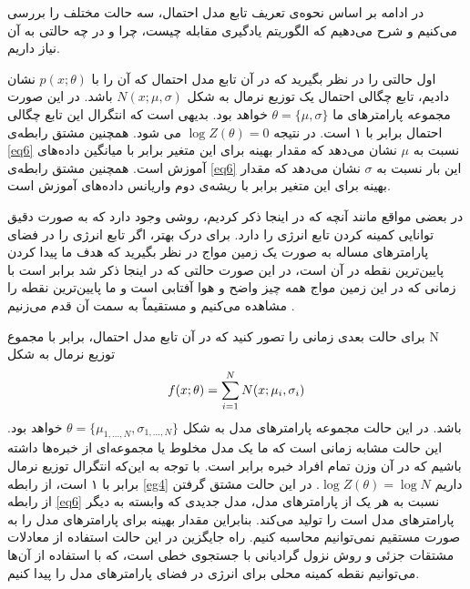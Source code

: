 در ادامه بر اساس نحوه‌ی تعریف تابع مدل احتمال، سه‌ حالت مختلف را بررسی‌ می‌‌کنیم و شرح می‌‌دهیم که الگوریتم یادگیری مقابله چیست، چرا و در چه حالتی به آن نیاز داریم.

اول حالتی را در نظر بگیرید که در آن تابع مدل احتمال
 که آن را با
$p(x;\theta)$
نشان دادیم، تابع چگالی احتمال یک توزیع نرمال
 به شکل
$N(x;\mu,\sigma)$
باشد. در این صورت مجموعه پارامتر‌های ما
$\theta = \{\mu,\sigma\}$
خواهد بود. بدیهی‌ است که انتگرال این تابع چگالی احتمال برابر با ۱ است. در نتیجه
$\log Z(\theta)=0$
می‌ شود. همچنین مشتق رابطه‌ی
\ref{eq6}
نسبت به
$\mu$
نشان می‌‌دهد که مقدار بهینه برای این متغیر
برابر با میانگین داده‌های آموزش است. همچنین مشتق رابطه‌ی
\ref{eq6}
این بار نسبت به
$\sigma$
نشان می‌‌دهد که مقدار بهینه برای این متغیر برابر با ریشه‌ی دوم واریانس داده‌های آموزش است.

در بعضی‌ مواقع مانند آنچه که در اینجا ذکر کردیم، روشی‌ وجود دارد که به صورت دقیق توانایی کمینه کردن تابع انرژی را دارد. برای درک بهتر، اگر تابع انرژی را در فضای پارامتر‌های مساله به صورت یک زمین مواج
در نظر بگیرید که هدف ما پیدا کردن پایین‌ترین نقطه در آن است، در این  صورت حالتی که در اینجا ذکر شد برابر است با زمانی‌ که در این زمین مواج همه چیز واضح و هوا آفتابی است و ما پایین‌ترین نقطه را مشاهده می‌‌کنیم و مستقیماً به سمت آن قدم می‌‌زنیم
\cite{woodfordnotes}.

برای حالت بعدی زمانی‌ را تصور کنید که در آن تابع مدل احتمال، برابر با مجموع
N
توزیع نرمال به شکل
\begin{align}
	\centering
	f(x;\theta)=\sum_{i=1}^N N(x;\mu_i,\sigma_i)
	\label{eg7}
\end{align}
باشد.
در این حالت مجموعه پارامترهای مدل به شکل
$\theta = \{\mu_{1,...,N},\sigma_{1,...,N} \}$ 
خواهد بود. این حالت مشابه زمانی‌ است که ما یک مدل مخلوط یا مجموعه‌ای از خبره‌ها 
داشته باشیم که در آن وزن تمام افراد خبره برابر است. با توجه به این‌که انتگرال توزیع نرمال برابر با ۱ است، از رابطه
\ref{eg4}
داریم
$\log Z(\theta) = \log N$.
 در این حالت مشتق گرفتن از رابطه
\ref{eq6}
نسبت به هر یک از پارامتر‌های مدل، مدل جدیدی که وابسته به دیگر پارامتر‌های مدل است را تولید می‌‌کند. بنابراین مقدار بهینه برای پارامتر‌های مدل را به صورت مستقیم نمی‌‌توانیم محاسبه کنیم. راه جایگزین در این حالت استفاده از معادلات مشتقات جزئی‌ 
و روش نزول گرادیانی
 با جستجوی خطی‌
  است، که با استفاده از آن‌ها می‌‌توانیم نقطه کمینه محلی برای انرژی در فضای پارامتر‌های مدل را پیدا کنیم.


